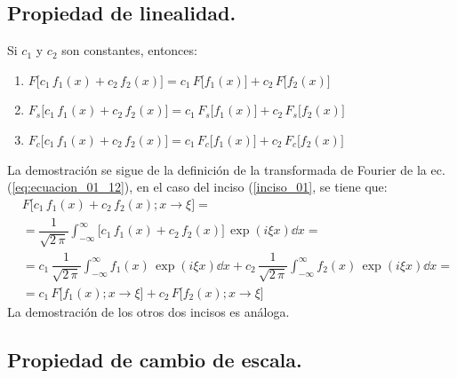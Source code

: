 \subsection{Propiedad de linealidad.}

Si $c_{1}$ y $c_{2}$ son constantes, entonces:
\begin{enumerate}[\thesubsection .1)]
\item \label{inciso_01} $F \big[c_{1} \, f_{1} (x) + c_{2} \, f_{2} (x)\big] = c_{1} \, F \big[ f_{1} (x)\big] + c_{2} \, F \big[ f_{2} (x)\big]$
\item $F_{s} \big[c_{1} \, f_{1} (x) + c_{2} \, f_{2} (x)\big] = c_{1} \, F_{s} \big[ f_{1} (x)\big] + c_{2} \, F_{s} \big[ f_{2} (x)\big]$
\item $F_{c} \big[c_{1} \, f_{1} (x) + c_{2} \, f_{2} (x)\big] = c_{1} \, F_{c} \big[ f_{1} (x)\big] + c_{2} \, F_{c} \big[ f_{2} (x)\big]$
\end{enumerate}
La demostración se sigue de la definición de la transformada de Fourier de la ec. (\ref{eq:ecuacion_01_12}), en el caso del inciso (\ref{inciso_01}, se tiene que: 
\begin{align*}
&F \big[ c_{1} \, f_{1} (x) + c_{2} \, f_{2} (x) ; x \to \xi \big] = \\[0.5em]
&= \dfrac{1}{\sqrt{2 \, \pi}} \int_{-\infty}^{\infty} \big[ c_{1} \, f_{1} (x) + c_{2} \, f_{2} (x) \big] \, \exp(i \xi x) \dd{x} = \\[0.5em]
&= c_{1} \, \dfrac{1}{\sqrt{2 \, \pi}} \int_{-\infty}^{\infty} f_{1}(x) \, \exp(i \xi x) \dd{x} + c_{2} \, \dfrac{1}{\sqrt{2 \, \pi}} \int_{-\infty}^{\infty} f_{2}(x) \, \exp(i \xi x) \dd{x} = \\[0.5em]
&= c_{1} \, F \big[ f_{1} (x) ; x \to \xi \big] + c_{2} \, F \big[ f_{2} (x) ; x \to \xi \big]
\end{align*}
La demostración de los otros dos incisos es análoga.

\subsection{Propiedad de cambio de escala.}

